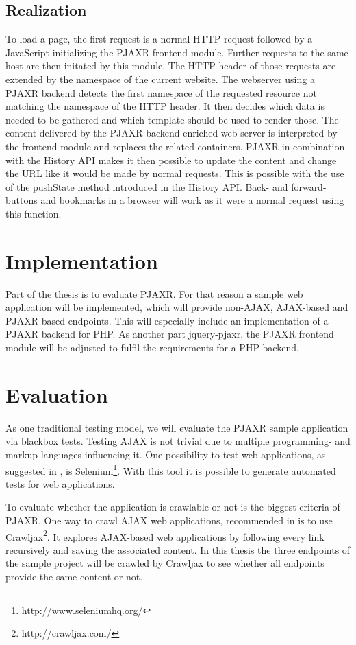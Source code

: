 \documentclass[f,bachelor,binding,twoside,palatino]{WeSTthesis}
\def \ajax {AJAX}
\def \pjaxr {PJAXR}
\def \jqueryPjaxr {jquery-pjaxr}
\def \httpRequest {HTTP request}
\begin{document}
  \subsection{Realization}
  To load a page, the first request is a normal \httpRequest{} followed by a JavaScript initializing the \pjaxr{} frontend module.
  Further requests to the same host are then initated by this module.
  The HTTP header of those requests are extended by the namespace of the current website.
  The webserver using a \pjaxr{} backend detects the first namespace of the requested resource not matching the namespace of the HTTP header.
  It then decides which data is needed to be gathered and which template should be used to render those.
  The content delivered by the \pjaxr{} backend enriched web server is interpreted by the frontend module and replaces the related containers.
  \pjaxr{} in combination with the History API makes it then possible to update the content and change the URL like it would be made by normal requests.
  This is possible with the use of the pushState method introduced in the History API.
  Back- and forward-buttons and bookmarks in a browser will work as it were a normal request using this function.
  
\section{Implementation}
  Part of the thesis is to evaluate \pjaxr{}. For that reason a sample web application will be implemented, which will provide non-\ajax{}, \ajax{}-based and \pjaxr{}-based endpoints.
  This will especially include an implementation of a \pjaxr{} backend for PHP. As another part \jqueryPjaxr{}, the \pjaxr{} frontend module will be adjusted to fulfil the requirements for a PHP backend.

\section{Evaluation}
  As one traditional testing model, we will evaluate the \pjaxr{} sample application via blackbox tests.
  Testing \ajax{} is not trivial due to multiple programming- and markup-languages influencing it. 
  One possibility to test web applications, as suggested in \cite{lundmark11}, is Selenium\footnote{http://www.seleniumhq.org/}.
  With this tool it is possible to generate automated tests for web applications.

  To evaluate whether the application is crawlable or not is the biggest criteria of \pjaxr{}.
  One way to crawl \ajax{} web applications, recommended in \cite{crawljax:tweb12} is to use Crawljax\footnote{http://crawljax.com/}. 
  It explores \ajax{}-based web applications by following every link recursively and saving the associated content. In this thesis the three endpoints of the sample project will be crawled by Crawljax to see whether all endpoints provide the same content or not.
  
\end{document}
